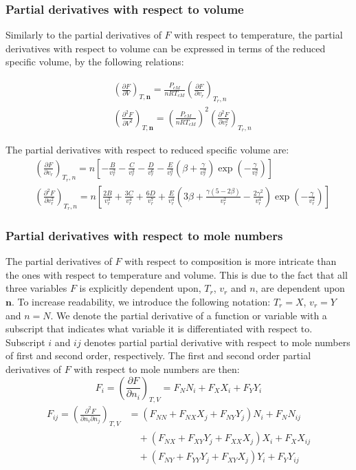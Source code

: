 \documentclass[english]{../thermomemo/thermomemo}
\numberwithin{equation}{section}
\newcommand*{\pder}[2]{\left(\frac{\partial #1}{\partial #2}\right)}
\newcommand*{\pdder}[2]{\left(\frac{\partial^2 #1}{\partial #2^2}\right)}
\newcommand*{\pdcross}[3]{\left(\frac{\partial^2 #1}{\partial #2 \partial #3}\right)}
\begin{document}
\subsubsection*{Partial derivatives with respect to volume}
Similarly to the partial derivatives of $F$ with respect to temperature, the partial derivatives with respect to volume can be expressed in terms of the reduced specific volume, by the following relations:

\begin{align}
& \pder{F}{V}_{T, \textbf{n}}  = \frac{P_{cM}}{n R T_{cM}} \pder{F}{v_r}_{T_r,n} \\
& \pdder{F}{V} _{T, \textbf{n}}  = \left(\frac{P_{cM}}{n R T_{cM}} \right)^2 \pdder{F}{v_r}_{T_r,n}
\end{align}

The partial derivatives with respect to reduced specific volume are:
\begin{align}
\label{eq:F_vr}
& \left( \frac{\partial F}{\partial v_r} \right)_{T_r, n} = n \left[ -\frac{B}{v_r^2} - \frac{C}{v_r^3} - \frac{D}{v_r^6} - \frac{E}{v_r^3} \left( \beta + \frac{\gamma}{v_r^2} \right)\exp \left(-\frac{\gamma}{v_r^2} \right) \right] \\
\label{eq:F_vrvr}
& \pdder{F}{v_r}_{T_r, n} = n \left[\frac{2B}{v_r^3} + \frac{3C}{v_r^4} + \frac{6D}{v_r^7} + \frac{E}{v_r^4} \left(3\beta + \frac{\gamma(5 - 2\beta)}{v_r^2} -\frac{2\gamma^2}{v_r^4}\right) \exp \left(-\frac{\gamma}{v_r^2} \right)\right]
\end{align}

\subsubsection*{Partial derivatives with respect to mole numbers}
The partial derivatives of $F$ with respect to composition is more intricate than the ones with respect to temperature and volume. This is due to the fact that all three variables $F$ is explicitly dependent upon, $T_r$, $v_r$ and $n$, are dependent upon $\textbf{n}$. To increase readability, we introduce the following notation: $T_r = X$, $v_r = Y$ and $n = N$. We denote the partial derivative of a function or variable with a subscript that indicates what variable it is differentiated with respect to. Subscript $i$ and $ij$ denotes partial partial derivative with respect to mole numbers of first and second order, respectively. The first and second order partial derivatives of $F$ with respect to mole numbers are then:
\begin{equation} 
\label{eq:F_i}
F_i = \pder{F}{n_i}_{T,V} = F_N N_i + F_X X_i + F_Y Y_i
\end{equation}
\begin{equation}
\label{eq:F_ij}
\begin{split}
F_{ij} = \pdcross{F}{n_i}{n_j}_{T,V} & = \left(F_{NN} + F_{NX}X_{j} + F_{NY} Y_{j} \right) N_i + F_N N_{ij}  \\
& \quad + \left( F_{N X} + F_{XY} Y_{j} + F_{XX} X_{j} \right) X_{i} + F_{X} X_{ij} \\
& \quad + \left( F_{N Y} + F_{YY} Y_{j} + F_{XY} X_{j} \right) Y_{i} + F_{Y}Y_{ij} 
\end{split}
\end{equation}
\end{document}
